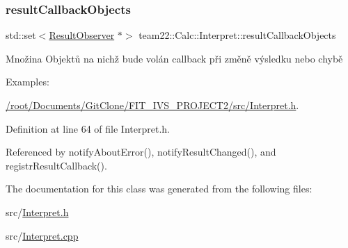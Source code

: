 \subsubsection{\texorpdfstring{result\+Callback\+Objects}{resultCallbackObjects}}
{\footnotesize\ttfamily std\+::set$<$\hyperlink{classteam22_1_1_calc_1_1_result_observer}{Result\+Observer} $\ast$$>$ team22\+::\+Calc\+::\+Interpret\+::result\+Callback\+Objects}

Množina Objektů na nichž bude volán callback při změně výsledku nebo chybě \begin{Desc}
\item[Examples\+: ]\par
\hyperlink{_2root_2_documents_2_git_clone_2_f_i_t__i_v_s__p_r_o_j_e_c_t2_2src_2_interpret_8h-example}{/root/\+Documents/\+Git\+Clone/\+F\+I\+T\+\_\+\+I\+V\+S\+\_\+\+P\+R\+O\+J\+E\+C\+T2/src/\+Interpret.\+h}.\end{Desc}


Definition at line 64 of file Interpret.\+h.



Referenced by notify\+About\+Error(), notify\+Result\+Changed(), and registr\+Result\+Callback().



The documentation for this class was generated from the following files\+:\begin{DoxyCompactItemize}
\item 
src/\hyperlink{_interpret_8h}{Interpret.\+h}\item 
src/\hyperlink{_interpret_8cpp}{Interpret.\+cpp}\end{DoxyCompactItemize}
